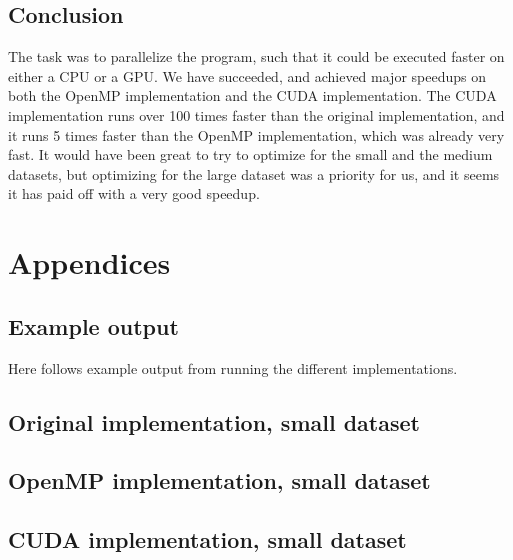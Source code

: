 \documentclass[11pt]{article}
\begin{document}
\subsection{Conclusion}
The task was to parallelize the program, such that it could be executed faster
on either a CPU or a GPU. We have succeeded, and achieved major speedups on 
both the OpenMP implementation and the CUDA implementation. The CUDA implementation
runs over 100 times faster than the original implementation, and it runs 5 times 
faster than the OpenMP implementation, which was already very fast. It would have
been great to try to optimize for the small and the medium datasets, but optimizing
for the large dataset was a priority for us, and it seems it has paid off with a 
very good speedup.



\newpage
\section{Appendices}
\subsection{Example output}
Here follows example output from running the different implementations.

\subsection{Original implementation, small dataset}

\subsection{OpenMP implementation, small dataset}

\subsection{CUDA implementation, small dataset}

\end{document}

